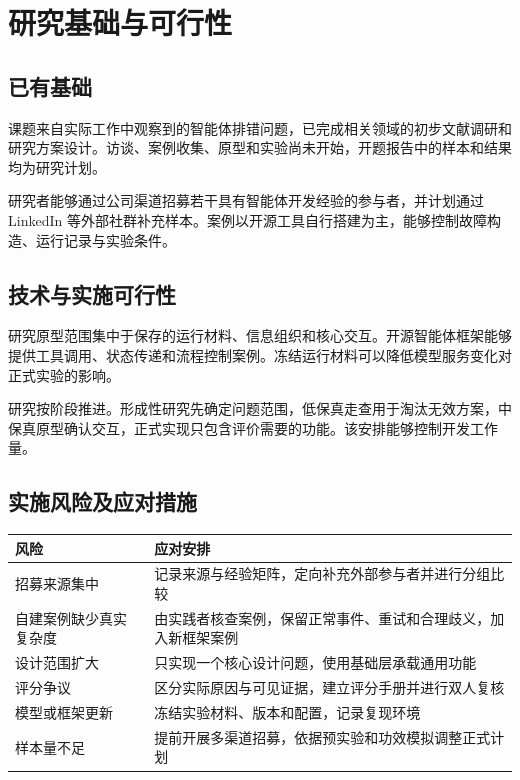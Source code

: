 \section{研究基础与可行性}

\subsection{已有基础}

课题来自实际工作中观察到的智能体排错问题，已完成相关领域的初步文献调研和研究方案设计。访谈、案例收集、原型和实验尚未开始，开题报告中的样本和结果均为研究计划。

研究者能够通过公司渠道招募若干具有智能体开发经验的参与者，并计划通过 LinkedIn 等外部社群补充样本。案例以开源工具自行搭建为主，能够控制故障构造、运行记录与实验条件。

\subsection{技术与实施可行性}

研究原型范围集中于保存的运行材料、信息组织和核心交互。开源智能体框架能够提供工具调用、状态传递和流程控制案例。冻结运行材料可以降低模型服务变化对正式实验的影响。

研究按阶段推进。形成性研究先确定问题范围，低保真走查用于淘汰无效方案，中保真原型确认交互，正式实现只包含评价需要的功能。该安排能够控制开发工作量。

\subsection{实施风险及应对措施}

\begin{table}[H]
  \centering
  \small
  \begin{tabularx}{\textwidth}{p{} Y}
    \toprule
    风险 & 应对安排 \\
    \midrule
    招募来源集中 & 记录来源与经验矩阵，定向补充外部参与者并进行分组比较 \\
    自建案例缺少真实复杂度 & 由实践者核查案例，保留正常事件、重试和合理歧义，加入新框架案例 \\
    设计范围扩大 & 只实现一个核心设计问题，使用基础层承载通用功能 \\
    评分争议 & 区分实际原因与可见证据，建立评分手册并进行双人复核 \\
    模型或框架更新 & 冻结实验材料、版本和配置，记录复现环境 \\
    样本量不足 & 提前开展多渠道招募，依据预实验和功效模拟调整正式计划 \\
    \bottomrule
  \end{tabularx}
\end{table}

